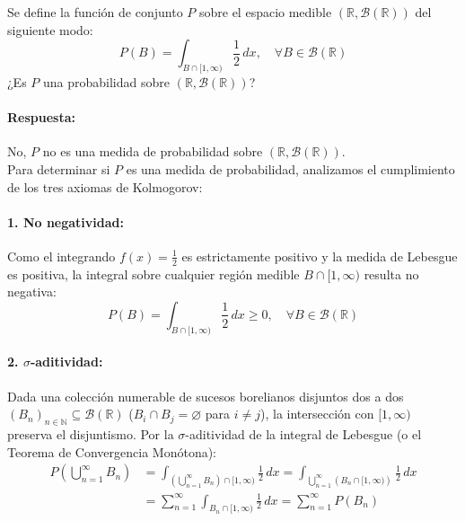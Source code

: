 \begin{problema}
Se define la función de conjunto $P$ sobre el espacio medible $(\mathbb{R}, \mathcal{B}(\mathbb{R}))$ del siguiente modo:
\[
    P(B) = \int_{B \cap [1, \infty)} \frac{1}{2} \, dx, \quad \forall B \in \mathcal{B}(\mathbb{R})
\]
¿Es $P$ una probabilidad sobre $(\mathbb{R}, \mathcal{B}(\mathbb{R}))$?

\tcblower

\paragraph{Respuesta:}
No, $P$ no es una medida de probabilidad sobre $(\mathbb{R}, \mathcal{B}(\mathbb{R}))$.\\[4pt]
Para determinar si $P$ es una medida de probabilidad, analizamos el cumplimiento de los tres axiomas de Kolmogorov:

\paragraph{1. No negatividad:}
Como el integrando $f(x) = \frac{1}{2}$ es estrictamente positivo y la medida de Lebesgue es positiva, la integral sobre cualquier región medible $B \cap [1, \infty)$ resulta no negativa:
\[
    P(B) = \int_{B \cap [1, \infty)} \frac{1}{2} \, dx \ge 0, \quad \forall B \in \mathcal{B}(\mathbb{R})
\]

\paragraph{2. $\sigma$-aditividad:}
Dada una colección numerable de sucesos borelianos disjuntos dos a dos $(B_n)_{n \in \mathbb{N}} \subseteq \mathcal{B}(\mathbb{R})$ ($B_i \cap B_j = \varnothing$ para $i \neq j$), la intersección con $[1, \infty)$ preserva el disjuntismo. Por la $\sigma$-aditividad de la integral de Lebesgue (o el Teorema de Convergencia Monótona):
\[
    \begin{array}{rl}
        \displaystyle P\left( \bigcup_{n=1}^\infty B_n \right) & \displaystyle = \int_{\left(\bigcup_{n=1}^\infty B_n\right) \cap [1, \infty)} \frac{1}{2} \, dx = \int_{\bigcup_{n=1}^\infty \left(B_n \cap [1, \infty)\right)} \frac{1}{2} \, dx \\[16pt]
        & \displaystyle = \sum_{n=1}^\infty \int_{B_n \cap [1, \infty)} \frac{1}{2} \, dx = \sum_{n=1}^\infty P(B_n)
    \end{array}
\]


\end{problema}
